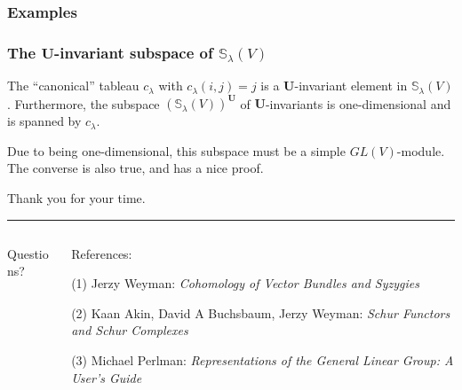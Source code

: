 \documentclass[mathserif]{beamer}
\begin{document}
%
\begin{frame}
    \frametitle{Examples}

    

\end{frame}

%
\begin{frame}

    

\end{frame}

%
\begin{frame}

    

\end{frame}

%
\begin{frame}
    \frametitle{The $\mathbf{U}$-invariant subspace of $\mathbb{S}_\lambda(V)$}

    The ``canonical'' tableau $c_\lambda$ with $c_\lambda(i,j) = j$ is a $\mathbf{U}$-invariant element in $\mathbb{S}_\lambda(V)$. Furthermore, the subspace $(\mathbb{S}_\lambda(V))^{\mathbf{U}}$ of $\mathbf{U}$-invariants is one-dimensional and is spanned by $c_\lambda$.

    Due to being one-dimensional, this subspace must be a simple $GL(V)$-module. The converse is also true, and has a nice proof.

\end{frame}

%
\begin{frame}
    \begin{flushright}
        {\color{black!15!pastelblue}Thank you for your time.}
        \end{flushright}
        \hrule
    \begin{columns}
    \begin{column}{0.3\textwidth}
        \begin{block}{}{
        \begin{center}\Large  Questions?\end{center}}
        \end{block}\vspace{0em}
    \end{column}
    \begin{column}{0.7\textwidth}
        \begin{block}{}{
        \begin{center}\Large  References:\end{center}}
    \end{block}
(1) Jerzy Weyman: \textit{Cohomology of Vector Bundles and Syzygies}

(2) Kaan Akin, David A Buchsbaum, Jerzy Weyman: \textit{Schur Functors and Schur Complexes}

(3) Michael Perlman: \textit{Representations of the General Linear Group: A User's Guide}
    \end{column}
    \end{columns}
\end{frame}
\end{document}
